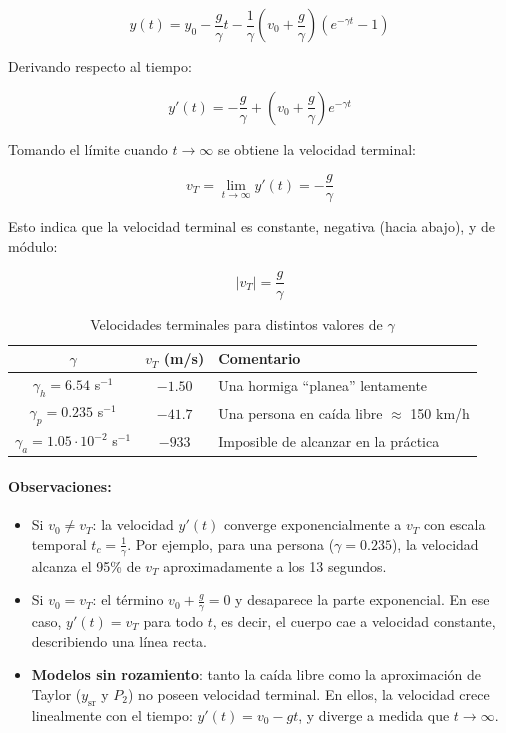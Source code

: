 \documentclass{article}
\begin{document}
\[
y(t) = y_0 - \frac{g}{\gamma} t - \frac{1}{\gamma} \left( v_0 + \frac{g}{\gamma} \right)\left( e^{-\gamma t} - 1 \right)
\]

Derivando respecto al tiempo:

\[
y'(t) = -\frac{g}{\gamma} + \left( v_0 + \frac{g}{\gamma} \right) e^{-\gamma t}
\]

Tomando el límite cuando $t \to \infty$ se obtiene la velocidad terminal:

\[
v_T = \lim_{t \to \infty} y'(t) = -\frac{g}{\gamma}
\]

Esto indica que la velocidad terminal es constante, negativa (hacia abajo), y de módulo:

\[
|v_T| = \frac{g}{\gamma}
\]

\begin{table}[H]
\centering
\begin{tabular}{|c|c|l|}
\hline
$\gamma$ & $v_T$ (m/s) & Comentario \\
\hline
$\gamma_h = 6.54$ s$^{-1}$ & $-1.50$ & Una hormiga ``planea'' lentamente \\
$\gamma_p = 0.235$ s$^{-1}$ & $-41.7$ & Una persona en caída libre $\approx$ 150 km/h \\
$\gamma_a = 1.05 \cdot 10^{-2}$ s$^{-1}$ & $-933$ & Imposible de alcanzar en la práctica \\
\hline
\end{tabular}
\caption{Velocidades terminales para distintos valores de $\gamma$}
\end{table}

\paragraph{Observaciones:}

\begin{itemize}
    \item Si $v_0 \neq v_T$: la velocidad $y'(t)$ converge exponencialmente a $v_T$ con escala temporal $t_c = \frac{1}{\gamma}$.
    Por ejemplo, para una persona ($\gamma = 0.235$), la velocidad alcanza el 95\% de $v_T$ aproximadamente a los 13 segundos.

    \item Si $v_0 = v_T$: el término $v_0 + \frac{g}{\gamma} = 0$ y desaparece la parte exponencial. En ese caso, $y'(t) = v_T$ para todo $t$, es decir, el cuerpo cae a velocidad constante, describiendo una línea recta.

    \item \textbf{Modelos sin rozamiento}: tanto la caída libre como la aproximación de Taylor ($y_{\text{sr}}$ y $P_2$) no poseen velocidad terminal. En ellos, la velocidad crece linealmente con el tiempo: $y'(t) = v_0 - gt$, y diverge a medida que $t \to \infty$.
\end{itemize}
\end{document}
